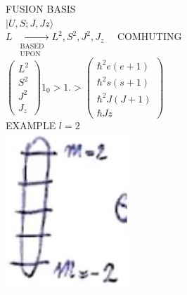 \documentclass[10pt]{article}
\begin{document}
FUSION BASIS\\
$|U, S ; J, J z\rangle$\\
$L \xrightarrow[\substack{\text { BASED } \\ \text { UPON }}]{ } L^{2}, S^{2}, J^{2}, J_{z} \quad$ COMHUTING\\
$\left(\begin{array}{l}L^{2} \\ S^{2} \\ J^{2} \\ J_{z}\end{array}\right) 1_{0}>1 .>\left(\begin{array}{c}\hbar^{2} e(e+1) \\ \hbar^{2} s(s+1) \\ \hbar^{2} J(J+1) \\ \hbar J z\end{array}\right)$\\
EXAMPLE $l=2$\\
\includegraphics[max width=\textwidth, center]{2025_10_16_e34e240cf6beac2f9e0dg-4}\\
\end{document}

